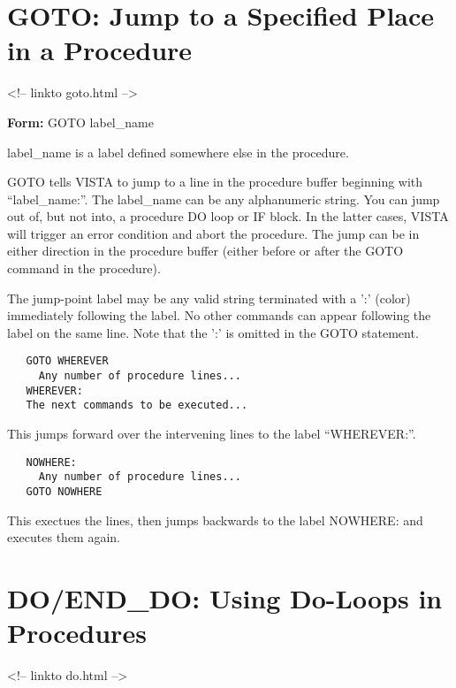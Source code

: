 \section{GOTO: Jump to a Specified Place in a Procedure}
\begin{rawhtml}
<!-- linkto goto.html -->
\end{rawhtml}

\begin{command}
  \item[\textbf{Form: } GOTO label\_name\hfill]{}
  \item[label\_name]{is a label defined somewhere else in the procedure.}
\end{command}
GOTO tells VISTA to jump to a line in the procedure buffer beginning with
``label\_name:''.  The label\_name can be any alphanumeric string.  You can
jump out of, but not into, a procedure DO loop or IF block.  In the latter
cases, VISTA will trigger an error condition and abort the procedure.  The
jump can be in either direction in the procedure buffer (either before or
after the GOTO command in the procedure).

The jump-point label may be any valid string terminated with a ':' (color)
immediately following the label.  No other commands can appear following
the label on the same line.  Note that the ':' is omitted in the GOTO
statement.

\begin{verbatim}
   GOTO WHEREVER
     Any number of procedure lines...
   WHEREVER:
   The next commands to be executed...
\end{verbatim}
This jumps forward over the intervening lines to the label ``WHEREVER:''.

\begin{verbatim}
   NOWHERE:
     Any number of procedure lines...
   GOTO NOWHERE
\end{verbatim}
This exectues the lines, then jumps backwards to the label NOWHERE: and
executes them again.

\section{DO/END\_DO: Using Do-Loops in Procedures}
\begin{rawhtml}
<!-- linkto do.html -->
\end{rawhtml}

